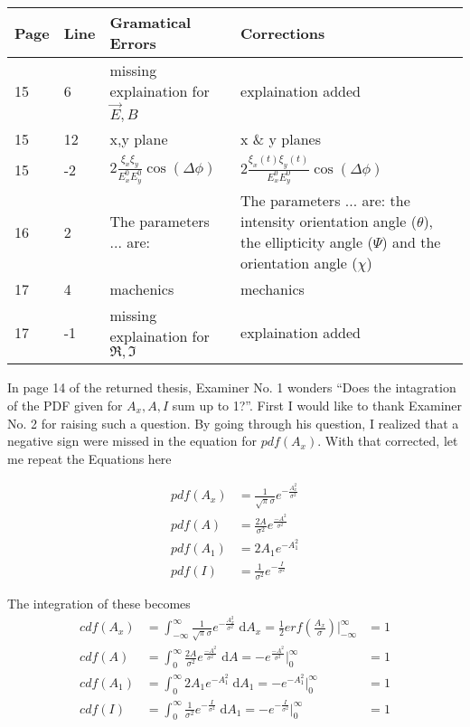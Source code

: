 \noindent
\begin{longtable}[c]{p{}|p{}|p{}|p{}}
\textbf{Page} & \textbf{Line} & \textbf{Gramatical Errors} & \textbf{Corrections} \\
 \hline
 \endhead
15 & 6 & missing explaination for $\vec{E},B$ & explaination added \\
15 & 12 & x,y plane & x \& y planes \\
15 & -2 & $2 \frac{\xi_x \xi_y}{E_x^0 E_y^0} \cos (\Delta \phi)$ & $2 \frac{\xi_x(t) \xi_y(t)}{E_x^0 E_y^0} \cos (\Delta \phi)$ \\
16 & 2 & The parameters ... are: & The parameters ... are: the intensity orientation angle ($\theta$), the ellipticity angle ($\Psi$) and the orientation angle ($\chi$) \\
17 & 4 & machenics & mechanics \\
17 & -1 & missing explaination for $\Re,\Im$ & explaination added \\
\end{longtable}    

In page 14 of the returned thesis, Examiner No. 1 wonders ``Does the intagration of the PDF given for $A_x, A, I$ sum up to 1?''.
First I would like to thank Examiner No. 2 for raising such a question.
By going through his question, I realized that a negative sign were missed in the equation for $pdf(A_x)$.
With that corrected, let me repeat the Equations here

\begin{align}
pdf(A_x) &= \frac{1}{\sqrt{\pi} \sigma} e^{- \frac{A_x^2}{\sigma^2}} \\
pdf(A)   &= \frac{2A}{\sigma^2} e^{\frac{-A^2}{\sigma^2}} \\
pdf(A_1) &= 2A_1 e^{-A_1^2} \\
pdf(I)   &= \frac{1}{\sigma^2} e^{-\frac{I}{\sigma^2}}
\end{align}

The integration of these becomes
\begin{align}
cdf(A_x) &= \int_{-\infty}^{\infty} \frac{1}{\sqrt{\pi} \sigma} e^{- \frac{A_x^2}{\sigma^2}}  \; \mathrm{d}A_x = \frac{1}{2} erf \left( \frac{A_x}{\sigma} \right)  \Big|_{-\infty}^{\infty} &= 1 \\
cdf(A) &= \int_0^{\infty} \frac{2A}{\sigma^2} e^{\frac{-A^2}{\sigma^2}}  \; \mathrm{d}A = -e^{\frac{-A^2}{\sigma^2}} \Big|_0^{\infty} &= 1\\
cdf(A_1) &= \int_0^{\infty} 2A_1 e^{-A_1^2} \; \mathrm{d}A_1 = -e^{-A_1^2} \Big|_0^{\infty} &= 1\\
cdf(I) &= \int_0^{\infty} \frac{1}{\sigma^2} e^{-\frac{I}{\sigma^2}} \; \mathrm{d}A_1 = -e^{-\frac{I}{\sigma^2}}  \Big|_0^{\infty} &= 1
\end{align}


